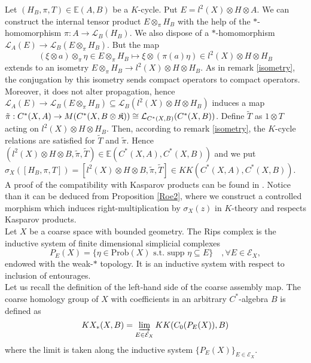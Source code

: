 Let $(H_B,\pi,T)\in\mathbb E(A,B)$ be a $K$-cycle. Put $E = l^2(X)\otimes H\otimes A$. We can construct the internal tensor product  $E\otimes_\pi H_B$ with the help of the $*$-homomorphism $\pi : A \rightarrow \mathcal L_B(H_B)$. We also dispose of a $*$-homomorphism $\mathcal L_A(E)\rightarrow \mathcal L_B(E\otimes_\pi H_B)$. But the map 
\[(\xi\otimes a)\otimes_\pi \eta \in E\otimes_\pi H_B \mapsto \xi\otimes (\pi(a)\eta)\in l^2(X)\otimes H\otimes H_B \] %
extends to an isometry $E\otimes_\pi H_B \rightarrow l^2(X)\otimes H\otimes  H_B$. As in remark \ref{isometry}, the conjugation by this isometry sends compact operators to compact operators. Moreover, it does not alter propagation, hence $\mathcal L_A(E)\rightarrow \mathcal L_B(E\otimes_\pi H_B)\subseteq \mathcal L_B(l^2(X)\otimes H\otimes H_B)$ induces a map $\tilde \pi : C^*(X,A)\rightarrow \mathcal \mathcal M(C^*(X,B\otimes\mathfrak K))\cong \mathcal L_{C^*(X,B)}(C^*(X,B))$. Define $\tilde T$ as $1\otimes T$ acting on $l^2(X)\otimes H \otimes H_B$. Then, according to remark \ref{isometry}, the $K$-cycle relations are satisfied for $\tilde T$ and $\tilde \pi$. Hence $(l^2(X)\otimes H\otimes B,\tilde \pi,\tilde T)\in \mathbb E(C^*(X,A),C^*(X,B))$ and we put $\sigma_X([H_B,\pi,T])=[l^2(X)\otimes H\otimes B,\tilde \pi,\tilde T]\in KK(C^*(X,A),C^*(X,B))$.\\

A proof of the compatibility with Kasparov products can be found in \cite{OY3}. Notice than it can be deduced from Proposition \ref{Roe2}, where we construct a controlled morphism which induces right-multiplication by $\sigma_X(z)$ in $K$-theory and respects Kasparov products.\\ 

Let $X$ be a coarse space with bounded geometry. The Rips complex is the inductive system of finite dimensional simplicial complexes
\[P_E(X)=\{\eta\in \text{Prob}(X)\text{ s.t. supp }\eta\subseteq E\}\quad,\forall E\in \mathcal E_X,\]
endowed with the weak-$*$ topology. It is an inductive system with respect to inclusion of entourages.\\
 
Let us recall the definition of the left-hand side of the coarse assembly map. The coarse homology group of $X$ with coefficients in an arbitrary $C^*$-algebra $B$ is defined as 
\[KX_*(X,B)=\varinjlim_{E\in \mathcal E_X} KK(C_0(P_E(X)),B)\]
where the limit is taken along the inductive system $\{P_E(X)\}_{E\in\mathcal E_X}$. \\


